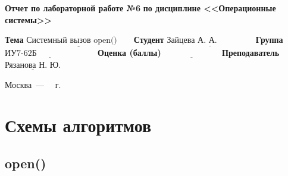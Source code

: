 \documentclass[a4paper,14pt]{extreport}
\begin{document}
\begin{titlepage}
		\begin{center}
			\noindent\begin{minipage}{1.1\textwidth}\centering
				\Large\textbf{  Отчет по лабораторной работе №6}\newline
				\textbf{по дисциплине <<Операционные системы>>}\newline\newline\newline
			\end{minipage}
		\end{center}
		
		\noindent\textbf{Тема} $\underline{\text{Системный вызов open()~~~~~}}$\newline\newline
		\noindent\textbf{Студент} $\underline{\text{Зайцева А. А.~~~~~~~~~~~~~}}$\newline\newline
		\noindent\textbf{Группа} $\underline{\text{ИУ7-62Б~~~~~~~~~~~~~~~~~~~~~}}$\newline\newline
		\noindent\textbf{Оценка (баллы)} $\underline{\text{~~~~~~~~~~~~~~~~~~~~}}$\newline\newline
		\noindent\textbf{Преподаватель} $\underline{\text{Рязанова Н. Ю.}}$\newline\newline\newline
		
		\begin{center}
			\vfill
			Москва~---~\the\year
			~г.
		\end{center}
	\end{titlepage}




\chapter{Схемы алгоритмов}

\section{open()}
\end{document}
